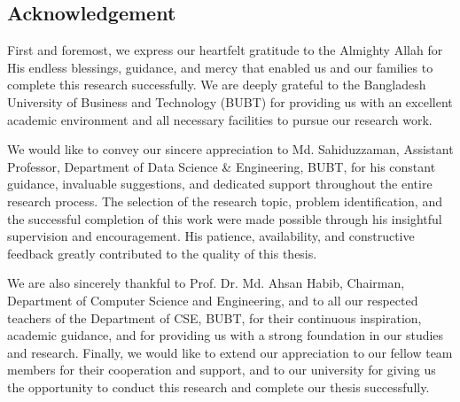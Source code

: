 \begin{center}
    \section*{Acknowledgement}
\end{center}
\large First and foremost, we express our heartfelt gratitude to the Almighty Allah for His endless blessings, guidance, and mercy that enabled us and our families to complete this research successfully. We are deeply grateful to the Bangladesh University of Business and Technology (BUBT) for providing us with an excellent academic environment and all necessary facilities to pursue our research work.

We would like to convey our sincere appreciation to Md. Sahiduzzaman, Assistant Professor, Department of Data Science \& Engineering, BUBT, for his constant guidance, invaluable suggestions, and dedicated support throughout the entire research process. The selection of the research topic, problem identification, and the successful completion of this work were made possible through his insightful supervision and encouragement. His patience, availability, and constructive feedback greatly contributed to the quality of this thesis.

We are also sincerely thankful to Prof. Dr. Md. Ahsan Habib, Chairman, Department of Computer Science and Engineering, and to all our respected teachers of the Department of CSE, BUBT, for their continuous inspiration, academic guidance, and for providing us with a strong foundation in our studies and research. Finally, we would like to extend our appreciation to our fellow team members for their cooperation and support, and to our university for giving us the opportunity to conduct this research and complete our thesis successfully.
